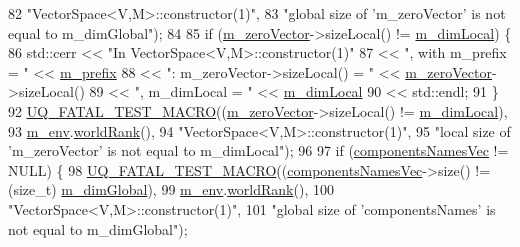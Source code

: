 \begin{DoxyCode}
82                       \textcolor{stringliteral}{"VectorSpace<V,M>::constructor(1)"},
83                       \textcolor{stringliteral}{"global size of 'm\_zeroVector' is not equal to m\_dimGlobal"});
84 
85   \textcolor{keywordflow}{if} (\hyperlink{class_q_u_e_s_o_1_1_vector_space_a0faa184316e08edb286a1bd0a5059b10}{m\_zeroVector}->sizeLocal() != \hyperlink{class_q_u_e_s_o_1_1_vector_space_aa6db91aca8a1f79e27d2f472528850bb}{m\_dimLocal}) \{
86     std::cerr << \textcolor{stringliteral}{"In VectorSpace<V,M>::constructor(1)"}
87               << \textcolor{stringliteral}{", with m\_prefix = "} << \hyperlink{class_q_u_e_s_o_1_1_vector_set_a472995c02b59c8f3cd77230b39535cca}{m\_prefix}
88               << \textcolor{stringliteral}{": m\_zeroVector->sizeLocal() = "} << \hyperlink{class_q_u_e_s_o_1_1_vector_space_a0faa184316e08edb286a1bd0a5059b10}{m\_zeroVector}->sizeLocal()
89               << \textcolor{stringliteral}{", m\_dimLocal = "}                << \hyperlink{class_q_u_e_s_o_1_1_vector_space_aa6db91aca8a1f79e27d2f472528850bb}{m\_dimLocal}
90               << std::endl;
91   \}
92   \hyperlink{_defines_8h_a56d63d18d0a6d45757de47fcc06f574d}{UQ\_FATAL\_TEST\_MACRO}((\hyperlink{class_q_u_e_s_o_1_1_vector_space_a0faa184316e08edb286a1bd0a5059b10}{m\_zeroVector}->sizeLocal() != 
      \hyperlink{class_q_u_e_s_o_1_1_vector_space_aa6db91aca8a1f79e27d2f472528850bb}{m\_dimLocal}),
93                       \hyperlink{class_q_u_e_s_o_1_1_vector_set_a77f3b57109bc1d89b4111f47458df770}{m\_env}.\hyperlink{class_q_u_e_s_o_1_1_base_environment_a78b57112bbd0e6dd0e8afec00b40ffa7}{worldRank}(),
94                       \textcolor{stringliteral}{"VectorSpace<V,M>::constructor(1)"},
95                       \textcolor{stringliteral}{"local size of 'm\_zeroVector' is not equal to m\_dimLocal"});
96 
97   \textcolor{keywordflow}{if} (\hyperlink{class_q_u_e_s_o_1_1_vector_space_aa315ff4efb4be69a64e341e3ebddca56}{componentsNamesVec} != NULL) \{
98     \hyperlink{_defines_8h_a56d63d18d0a6d45757de47fcc06f574d}{UQ\_FATAL\_TEST\_MACRO}((\hyperlink{class_q_u_e_s_o_1_1_vector_space_aa315ff4efb4be69a64e341e3ebddca56}{componentsNamesVec}->size() != (size\_t) 
      \hyperlink{class_q_u_e_s_o_1_1_vector_space_ad3efef4a407fdc5c98fded11f2f2444e}{m\_dimGlobal}),
99                         \hyperlink{class_q_u_e_s_o_1_1_vector_set_a77f3b57109bc1d89b4111f47458df770}{m\_env}.\hyperlink{class_q_u_e_s_o_1_1_base_environment_a78b57112bbd0e6dd0e8afec00b40ffa7}{worldRank}(),
100                         \textcolor{stringliteral}{"VectorSpace<V,M>::constructor(1)"},
101                         \textcolor{stringliteral}{"global size of 'componentsNames' is not equal to m\_dimGlobal"});

\end{DoxyCode}
